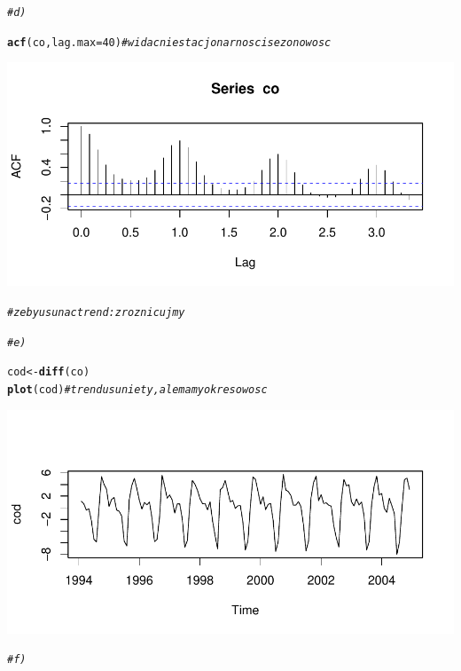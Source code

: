 \documentclass[10pt,a4paper,noindentfirst]{article}\usepackage[]{graphicx}\usepackage[]{color}
\makeatletter
\def\maxwidth{ %
  \ifdim\Gin@nat@width>\linewidth
    \linewidth
  \else
    \Gin@nat@width
  \fi
}
\newcommand{\hlnum}[1]{\textcolor[rgb]{0.686,0.059,0.569}{#1}}%
\newcommand{\hlcom}[1]{\textcolor[rgb]{0.678,0.584,0.686}{\textit{#1}}}%
\newcommand{\hlstd}[1]{\textcolor[rgb]{0.345,0.345,0.345}{#1}}%
\newcommand{\hlkwb}[1]{\textcolor[rgb]{0.69,0.353,0.396}{#1}}%
\newcommand{\hlkwc}[1]{\textcolor[rgb]{0.333,0.667,0.333}{#1}}%
\newcommand{\hlkwd}[1]{\textcolor[rgb]{0.737,0.353,0.396}{\textbf{#1}}}%
\newenvironment{kframe}{%
 \def\at@end@of@kframe{}%
 \ifinner\ifhmode%
  \def\at@end@of@kframe{\end{minipage}}%
  \begin{minipage}{\columnwidth}%
 \fi\fi%
 \def\FrameCommand##1{\hskip\@totalleftmargin \hskip-\fboxsep
 \colorbox{shadecolor}{##1}\hskip-\fboxsep
     \hskip-\linewidth \hskip-\@totalleftmargin \hskip\columnwidth}%
 \MakeFramed {\advance\hsize-\width
   \@totalleftmargin\z@ \linewidth\hsize
   \@setminipage}}%
 {\par\unskip\endMakeFramed%
 \at@end@of@kframe}
\newenvironment{knitrout}{}{} %
\makeatother
\begin{document}
\begin{knitrout}
{}


\begin{kframe}\begin{alltt}
\hlcom{# d)}

\hlkwd{acf}\hlstd{(co,}\hlkwc{lag.max}\hlstd{=}\hlnum{40}\hlstd{)}   \hlcom{# widac niestacjonarnosc i sezonowosc}
\end{alltt}
\end{kframe}

{\centering \includegraphics[width=\maxwidth]{figure/unnamed-chunk-14} 

}


\begin{kframe}\begin{alltt}
\hlcom{# zeby usunac trend: zroznicujmy}

\hlcom{# e)}

\hlstd{cod} \hlkwb{<-} \hlkwd{diff}\hlstd{(co)}
\hlkwd{plot}\hlstd{(cod)}   \hlcom{# trend usuniety, ale mamy okresowosc}
\end{alltt}
\end{kframe}

{\centering \includegraphics[width=\maxwidth]{figure/unnamed-chunk-15} 

}


\begin{kframe}\begin{alltt}
\hlcom{# f)}


\end{alltt}
\end{kframe}
\end{knitrout}
\end{document}
